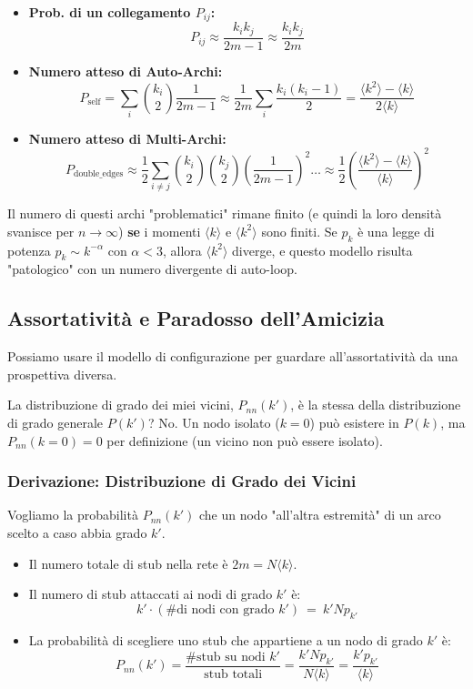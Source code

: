 \begin{itemize}
\item \textbf{Prob. di un collegamento $P_{ij}$:}
\begin{equation}
 P_{ij} \approx \frac{k_i k_j}{2m-1} \approx \frac{k_i k_j}{2m}
 \end{equation}

\item \textbf{Numero atteso di Auto-Archi:}
\begin{equation}
 P_{\text{self}} = \sum_i \binom{k_i}{2} \frac{1}{2m-1} \approx \frac{1}{2m} \sum_i \frac{k_i(k_i-1)}{2} = \frac{\langle k^2 \rangle - \langle k \rangle}{2 \langle k \rangle}
 \end{equation}

\item \textbf{Numero atteso di Multi-Archi:} 
\begin{equation}
 P_{\text{double\_edges}} \approx \frac{1}{2} \sum_{i \neq j} \binom{k_i}{2} \binom{k_j}{2} \left( \frac{1}{2m-1} \right)^2 \dots \approx \frac{1}{2} \left( \frac{\langle k^2 \rangle - \langle k \rangle}{\langle k \rangle} \right)^2
 \end{equation}
\end{itemize}
Il numero di questi archi "problematici" rimane finito (e quindi la loro densità svanisce per $n \to \infty$) \textbf{se} i momenti $\langle k \rangle$ e $\langle k^2 \rangle$ sono finiti. Se $p_k$ è una legge di potenza $p_k \sim k^{-\alpha}$ con $\alpha < 3$, allora $\langle k^2 \rangle$ diverge, e questo modello risulta "patologico" con un numero divergente di auto-loop.

\subsection{Assortatività e Paradosso dell'Amicizia}
Possiamo usare il modello di configurazione per guardare all'assortatività da una prospettiva diversa.


La distribuzione di grado dei miei vicini, $P_{nn}(k')$, è la stessa della distribuzione di grado generale $P(k')$?
No. Un nodo isolato ($k=0$) può esistere in $P(k)$, ma $P_{nn}(k=0) = 0$ per definizione (un vicino non può essere isolato).

\subsubsection{Derivazione: Distribuzione di Grado dei Vicini}
Vogliamo la probabilità $P_{nn}(k')$ che un nodo "all'altra estremità" di un arco scelto a caso abbia grado $k'$.
\begin{itemize}
\item Il numero totale di stub nella rete è $2m = N \langle k \rangle$.
\item Il numero di stub attaccati ai nodi di grado $k'$ è:
$$k' \cdot(\text{\# di nodi con grado } k')~=~k' N p_{k'}$$
\item La probabilità di scegliere uno stub che appartiene a un nodo di grado $k'$ è:
$$ P_{nn}(k') = \frac{\text{\# stub su nodi } k'}{\text{stub totali}} = \frac{k' N p_{k'}}{N \langle k \rangle} = \frac{k' p_{k'}}{\langle k \rangle} $$
\end{itemize}



